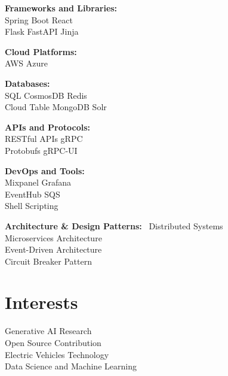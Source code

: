 \documentclass[]{sachin-resume-openfont}
\begin{document}
\begin{minipage}[t]{0.3\textwidth}
\medskip
\noindent \textbf{Frameworks and Libraries:} \\
Spring Boot \textbullet{} React \\
Flask \textbullet{} FastAPI \textbullet{} Jinja

\medskip
\noindent \textbf{Cloud Platforms:} \\
AWS \textbullet{} Azure

\medskip
\noindent \textbf{Databases:} \\
SQL \textbullet{} CosmosDB \textbullet{} Redis \\
Cloud Table \textbullet{} MongoDB \textbullet{} Solr

\medskip
\noindent \textbf{APIs and Protocols:} \\
RESTful APIs \textbullet{} gRPC \textbullet{} \\
Protobufs\textbullet{} gRPC-UI

\medskip
\noindent \textbf{DevOps and Tools:} \\
Mixpanel \textbullet{} Grafana \\
EventHub \textbullet{} SQS \\
Shell Scripting 
\sectionsep

\medskip
\noindent \textbf{Architecture \& Design Patterns:} \
Distributed Systems \\
Microservices Architecture \\
Event-Driven Architecture \\
Circuit Breaker Pattern 
\sectionsep


\section{Interests}
Generative AI Research \\
Open Source Contribution \\
Electric Vehicles Technology \\
Data Science and Machine Learning \\
\sectionsep

%
%

\end{minipage} 
\hfill
\end{document}
